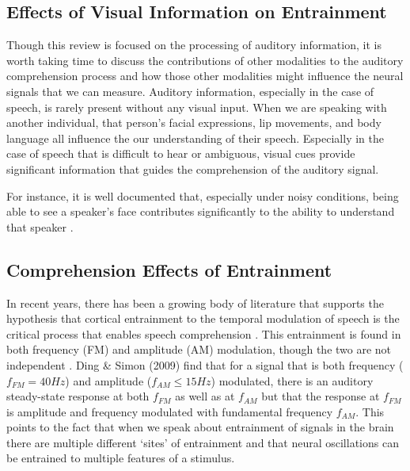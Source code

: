 \documentclass[titlepage]{article}
\begin{document}
  \subsection{Effects of Visual Information on Entrainment}

    Though this review is focused on the processing of auditory information, it
    is worth taking time to discuss the contributions of other modalities to
    the auditory comprehension process and how those other modalities might
    influence the neural signals that we can measure. Auditory information,
    especially in the case of speech, is rarely present without any visual
    input. When we are speaking with another individual, that person's facial
    expressions, lip movements, and body language all influence the our
    understanding of their speech. Especially in the case of speech that is
    difficult to hear or ambiguous, visual cues provide significant information
    that guides the comprehension of the auditory signal.

    For instance, it is well documented that, especially under noisy
    conditions, being able to see a speaker's face contributes significantly to
    the ability to understand that speaker \cite{Sumby1954,Erber1969}.

  \subsection{Comprehension Effects of Entrainment}

    In recent years, there has been a growing body of literature that supports
    the hypothesis that cortical entrainment to the temporal modulation of
    speech is the critical process that enables speech comprehension
    \cite{Meyer2018,Morillon2015,ZionGolumbic2013,Doelling2014}. This
    entrainment is found in both frequency (FM) and amplitude (AM) modulation,
    though the two are not independent \cite{Ding2009}. Ding \& Simon (2009)
    \cite{Ding2009} find that for a signal that is both frequency
    ($f_{FM}=40Hz$) and amplitude ($f_{AM}\leq 15Hz$) modulated, there is an
    auditory steady-state response at both $f_{FM}$ as well as at $f_{AM}$ but
    that the response at $f_{FM}$ is amplitude and frequency modulated with
    fundamental frequency $f_{AM}$. This points to the fact that when we speak
    about entrainment of signals in the brain there are multiple different
    `sites' of entrainment and that neural oscillations can be entrained to
    multiple features of a stimulus.
\end{document}
